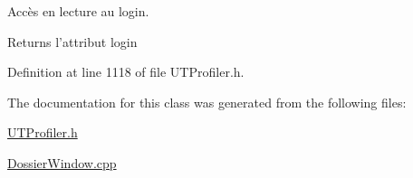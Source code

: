 Accès en lecture au login. 

\begin{DoxyReturn}{Returns}
l'attribut login 
\end{DoxyReturn}


Definition at line 1118 of file U\-T\-Profiler.\-h.



The documentation for this class was generated from the following files\-:\begin{DoxyCompactItemize}
\item 
\hyperlink{_u_t_profiler_8h}{U\-T\-Profiler.\-h}\item 
\hyperlink{_dossier_window_8cpp}{Dossier\-Window.\-cpp}\end{DoxyCompactItemize}
